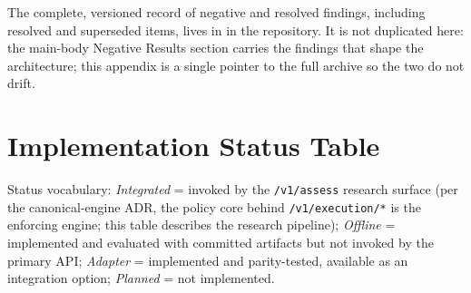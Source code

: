 \documentclass[10pt,twocolumn]{article}
\begin{document}
The complete, versioned record of negative and resolved findings,
including resolved and superseded items, lives in 
in the repository. It is not duplicated here: the main-body Negative Results
section carries the findings that shape the architecture; this appendix is a
single pointer to the full archive so the two do not drift.

\section{Implementation Status Table}
\label{app:impl}

Status vocabulary: \emph{Integrated} = invoked by the
\texttt{/v1/assess} research surface (per the canonical-engine ADR, the
policy core behind \texttt{/v1/execution/*} is the enforcing engine;
this table describes the research pipeline); \emph{Offline} =
implemented and evaluated with
committed artifacts but not invoked by the primary API; \emph{Adapter} =
implemented and parity-tested, available as an integration option;
\emph{Planned} = not implemented.
\end{document}
